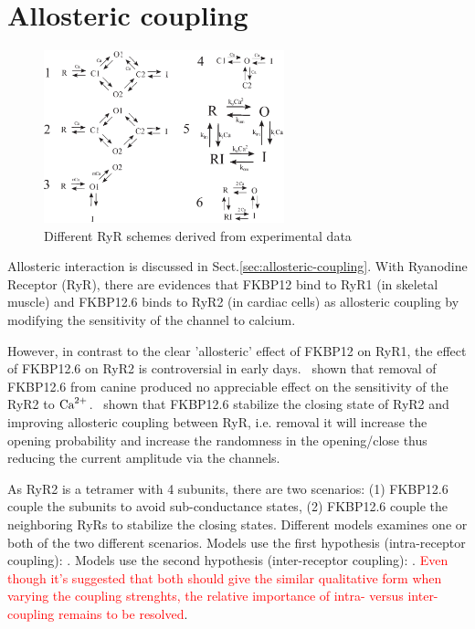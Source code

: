\section{Allosteric coupling}
\label{sec:allosteric-coupling-RYR}


\begin{figure}[hbt]
  \centerline{\includegraphics[height=5cm,
    angle=0]{./images/RyR_schemes.eps}}
  \caption{Different RyR schemes derived from experimental data}
\label{fig:RyR_schemes}
\end{figure}

Allosteric interaction is discussed in Sect.\ref{sec:allosteric-coupling}. With
Ryanodine Receptor (RyR), there are evidences that FKBP12 bind to RyR1 (in
skeletal muscle) and FKBP12.6 binds to RyR2 (in cardiac cells) as allosteric
coupling by modifying the sensitivity of the channel to calcium. 

However, in contrast to the clear 'allosteric' effect of FKBP12 on RyR1, the
effect of FKBP12.6 on RyR2 is controversial in early days.~\citep{timerman1993}
shown that removal of FKBP12.6 from canine produced no appreciable effect on the
sensitivity of the RyR2 to ${\text{Ca}^{2+}}$.~\citep{Kaftan1996} shown that FKBP12.6
stabilize the closing state of RyR2 and improving allosteric coupling between
RyR, i.e. removal it will increase the opening probability and increase the
randomness in the opening/close thus reducing the current amplitude via the
channels.

As RyR2 is a tetramer with 4 subunits, there are two scenarios: (1) FKBP12.6
couple the subunits to avoid sub-conductance states, (2) FKBP12.6 couple the
neighboring RyRs to stabilize the closing states. Different models examines one
or both of the two different scenarios. Models use the first hypothesis
(intra-receptor coupling): \citep{wang2005ecc}. Models use the second hypothesis
(inter-receptor coupling): \citep{stern1999lcm, sobie2002tcas, williams2011}.
\textcolor{red}{Even though it's suggested that both should give the similar
qualitative form when varying the coupling strenghts, the relative importance of
intra- versus inter- coupling remains to be resolved}.


